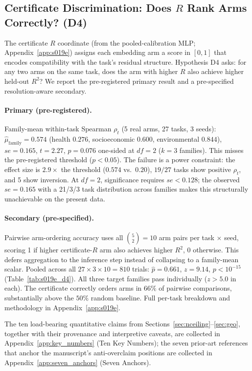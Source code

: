 \documentclass{article}
\begin{document}
\subsection{Certificate Discrimination: Does $R$ Rank Arms Correctly? (D4)}
\label{sec:d4}

The certificate $R$ coordinate (from the pooled-calibration MLP; Appendix~\ref{app:s019e}) assigns each embedding arm a score in $[0,1]$ that encodes compatibility with the task's residual structure. Hypothesis D4 asks: for any two arms on the same task, does the arm with higher $R$ also achieve higher held-out $R^2$? We report the pre-registered primary result and a pre-specified resolution-aware secondary.

\paragraph{Primary (pre-registered).} Family-mean within-task Spearman $\rho_t$ (5 real arms, 27 tasks, 3 seeds): $\hat{\mu}_{\text{family}} = 0.574$ (health $0.276$, socioeconomic $0.600$, environmental $0.844$), $se = 0.165$, $t = 2.27$, $p = 0.076$ one-sided at $df = 2$ ($k = 3$ families). This misses the pre-registered threshold ($p < 0.05$). The failure is a power constraint: the effect size is $2.9{\times}$ the threshold ($0.574$ vs.\ $0.20$), $19/27$ tasks show positive $\rho_t$, and 5 show inversion. At $df = 2$, significance requires $se < 0.128$; the observed $se = 0.165$ with a 21/3/3 task distribution across families makes this structurally unachievable on the present data.

\paragraph{Secondary (pre-specified).} Pairwise arm-ordering accuracy uses all $\binom{5}{2} = 10$ arm pairs per task $\times$ seed, scoring 1 if higher certificate-$R$ arm also achieves higher $R^2$, 0 otherwise. This defers aggregation to the inference step instead of collapsing to a family-mean scalar. Pooled across all $27 \times 3 \times 10 = 810$ trials: $\hat{p} = 0.661$, $z = 9.14$, $p < 10^{-15}$ (Table~\ref{tab:s019e_d4}). All three target families pass individually ($z > 5.0$ in each). The certificate correctly orders arms in $66\%$ of pairwise comparisons, substantially above the $50\%$ random baseline. Full per-task breakdown and methodology in Appendix~\ref{app:s019e}.

The ten load-bearing quantitative claims from Sections~\ref{sec:nceiling}--\ref{sec:geo}, together with their provenance and interpretive caveats, are collected in Appendix~\ref{app:key_numbers} (Ten Key Numbers); the seven prior-art references that anchor the manuscript's anti-overclaim positions are collected in Appendix~\ref{app:seven_anchors} (Seven Anchors).
\end{document}
